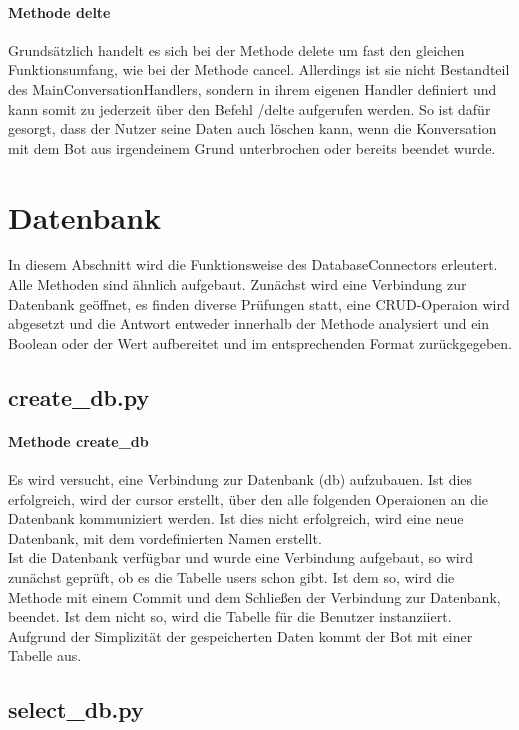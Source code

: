             \paragraph{Methode delte}
                Grundsätzlich handelt es sich bei der Methode delete um fast den gleichen Funktionsumfang, wie bei der Methode cancel. Allerdings ist sie nicht Bestandteil des Main\-ConversationHandlers, sondern in ihrem eigenen Handler definiert und kann somit zu jederzeit über den Befehl /delte aufgerufen werden. So ist dafür gesorgt, dass der Nutzer seine Daten auch löschen kann, wenn die Konversation mit dem Bot aus irgendeinem Grund unterbrochen oder bereits beendet wurde.


    \section{Datenbank}

        In diesem Abschnitt wird die Funktionsweise des Database\-Connectors erleutert. Alle Methoden sind ähnlich aufgebaut. Zunächst wird eine Verbindung zur Datenbank geöffnet, es finden diverse Prüfungen statt, eine CRUD-Operaion wird abgesetzt und die Antwort entweder innerhalb der Methode analysiert und ein Boolean oder der Wert aufbereitet und im entsprechenden Format zurückgegeben.
                
        \subsection{create\_db.py}
            \paragraph{Methode create\_db}
            Es wird versucht, eine Verbindung zur Datenbank (db) aufzubauen. Ist dies erfolgreich, wird der cursor erstellt, über den alle folgenden Operaionen an die Datenbank kommuniziert werden. Ist dies nicht erfolgreich, wird eine neue Datenbank, mit dem vordefinierten Namen erstellt.\\
            Ist die Datenbank verfügbar und wurde eine Verbindung aufgebaut, so wird zunächst geprüft, ob es die Tabelle users schon gibt. Ist dem so, wird die Methode mit einem Commit und dem Schließen der Verbindung zur Datenbank, beendet. Ist dem nicht so, wird die Tabelle für die Benutzer instanziiert. Aufgrund der Simplizität der gespeicherten Daten kommt der Bot mit einer Tabelle aus.


        \subsection{select\_db.py}

